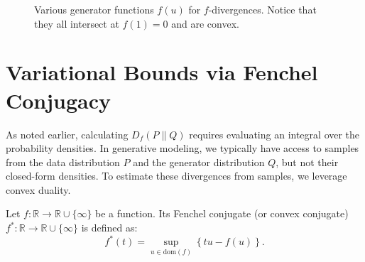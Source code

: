 \begin{figure}[htbp]
\centering
{}
\caption{Various generator functions $f(u)$ for $f$-divergences. Notice that they all intersect at $f(1)=0$ and are convex.}
\label{fig:f_funcs}
\end{figure}

\section{Variational Bounds via Fenchel Conjugacy}
As noted earlier, calculating $D_f(P \parallel Q)$ requires evaluating an integral over the probability densities. In generative modeling, we typically have access to samples from the data distribution $P$ and the generator distribution $Q$, but not their closed-form densities. To estimate these divergences from samples, we leverage convex duality.

\begin{definition}
Let $f: \mathbb{R} \to \mathbb{R} \cup \{\infty\}$ be a function. Its Fenchel conjugate (or convex conjugate) $f^*: \mathbb{R} \to \mathbb{R} \cup \{\infty\}$ is defined as:
\begin{equation}
    f^*(t) = \sup_{u \in \text{dom}(f)} \left\{ tu - f(u) \right\}.
\end{equation}
\end{definition}


